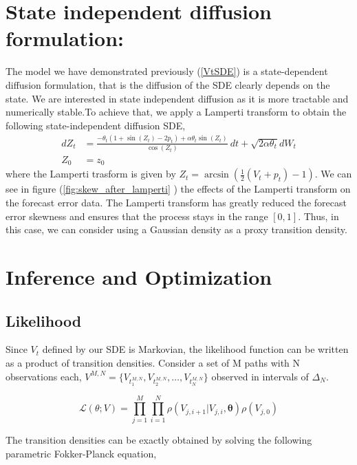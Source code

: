 \documentclass[10pt,twocolumn,letterpaper]{article}
\begin{document}
\section{State independent diffusion formulation:}
The model we have demonstrated previously (\ref{VtSDE}) is  a state-dependent diffusion formulation, that is the diffusion of the SDE clearly depends on the state.  We are interested in state independent diffusion as it is more tractable and numerically stable.To achieve that, we apply a Lamperti transform to obtain the following state-independent diffusion SDE,
\begin{equation}
  \begin{split}
    dZ_t&= \frac{- \theta_t (1+ \sin(Z_t) - 2p_t) + \alpha \theta_t \sin (Z_t)   }{\cos (Z_t)} \ dt + \sqrt{2 \alpha \theta_t} dW_t \\
    Z_0&=z_0
  \end{split}
\end{equation}
where the Lamperti trasform is given by $Z_t = \arcsin \left( \frac{1}{2} \left( V_t+p_t \right) - 1 \right) $. We can see in figure (\ref{fig:skew_after_lamperti} ) the effects of the Lamperti transform on the forecast error data. The Lamperti transform has greatly reduced  the forecast error skewness and ensures that the process stays in the range $[0,1]$. Thus, in this case,  we can consider using a Gaussian density as a proxy transition density.


\section{Inference and Optimization}

\subsection{Likelihood}


Since $V_t$ defined by our SDE is Markovian, the likelihood function can be written as a product of transition densities.  Consider a set of M paths with N observations each, $ V^{M,N}=\{ V_{t_1^{M,N}} , V_{t_2^{M,N}} ,\ldots , V_{t_N^{M,N}} \}$ observed in intervals of $\Delta_N$.

\begin{equation}
\mathcal{L}(\theta;V) =\prod\limits_{j=1}^M \prod\limits_{i=1}^N \rho ( {V_{j,i+1}|V_{j,i}},\bm{\theta} )  \rho (V_{j,0})
\label{likelihood}
\end{equation}

The transition densities can be exactly obtained by solving the following parametric Fokker-Planck equation,
\end{document}
